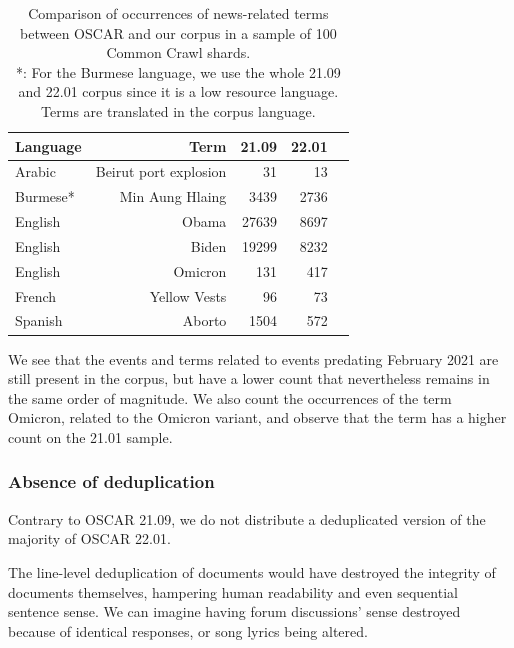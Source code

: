 \begin{table}[t]
    \centering\small
    \begin{tabular}{lrrrr}
        \toprule
        Language                  & Term                  & 21.09 & 22.01 \\
        \midrule
        \multirow{1}{*}{Arabic}   & Beirut port explosion & 31    & 13    \\
        \multirow{1}{*}{Burmese*} & Min Aung Hlaing       & 3439  & 2736  \\
        \multirow{1}{*}{English}  & Obama                 & 27639 & 8697  \\
        \multirow{1}{*}{English}  & Biden                 & 19299 & 8232  \\
        \multirow{1}{*}{English}  & Omicron               & 131   & 417   \\
        \multirow{1}{*}{French}   & Yellow Vests          & 96    & 73    \\
        \multirow{1}{*}{Spanish}  & Aborto                & 1504  & 572   \\
        \bottomrule
    \end{tabular}
    \caption{Comparison of occurrences of news-related terms between OSCAR and our corpus in a sample of 100 Common Crawl shards. \\ *: For the Burmese language, we use the whole 21.09 and 22.01 corpus since it is a low resource language. Terms are translated in the corpus language.}
    \label{tab:word_frequency_towards}
\end{table}

We see that the events and terms related to events predating February 2021 are still present in the corpus, but have a lower count that nevertheless remains in the same order of magnitude.
We also count the occurrences of the term Omicron, related to the Omicron variant, and observe that the term has a higher count on the 21.01 sample.

\subsubsection{Absence of deduplication}

Contrary to OSCAR 21.09, we do not distribute a deduplicated version of the majority of OSCAR 22.01.

The line-level deduplication of documents would have destroyed the integrity of documents themselves, hampering human readability and even sequential sentence sense. We can imagine having forum discussions' sense destroyed because of identical responses, or song lyrics being altered.

